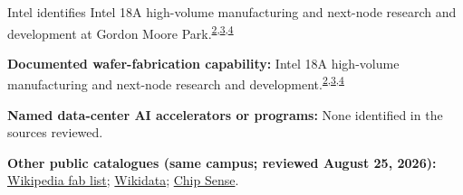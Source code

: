 \begin{minipage}[t][0.90\textheight][t]{\textwidth}
\begin{minipage}[t]{\textwidth}
\begin{minipage}[t]{0.32\textwidth}
\medskip
{\footnotesize Intel identifies Intel 18A high-volume manufacturing and next-node research and development at Gordon Moore Park.\nobreak\textsuperscript{\href{\detokenize{https://www.intc.com/filings-reports/all-sec-filings/content/0000050863-26-000011/intc-20251227.htm}}{\textcolor{accent}{2}},\href{\detokenize{https://www.intc.com/filings-reports/all-sec-filings/content/0000050863-26-000061/proxy2026.htm}}{\textcolor{accent}{3}},\href{\detokenize{https://web.archive.org/web/20260730143304/https://newsroom.intel.com/client-computing/intel-unveils-panther-lake-architecture-first-ai-pc-platform-built-on-18a}}{\textcolor{accent}{4}}}\par}
\medskip
{\footnotesize\textbf{Documented wafer-fabrication capability:} Intel 18A high-volume manufacturing and next-node research and development.\nobreak\textsuperscript{\href{\detokenize{https://www.intc.com/filings-reports/all-sec-filings/content/0000050863-26-000011/intc-20251227.htm}}{\textcolor{accent}{2}},\href{\detokenize{https://www.intc.com/filings-reports/all-sec-filings/content/0000050863-26-000061/proxy2026.htm}}{\textcolor{accent}{3}},\href{\detokenize{https://web.archive.org/web/20260730143304/https://newsroom.intel.com/client-computing/intel-unveils-panther-lake-architecture-first-ai-pc-platform-built-on-18a}}{\textcolor{accent}{4}}}\par}
\end{minipage}
\end{minipage}
\par\vspace{0.65em}
\medskip
{\footnotesize\textbf{Named data-center AI accelerators or programs:} None identified in the sources reviewed.\par}
\smallskip
{\sffamily\scriptsize\color{black!62}\textbf{Other public catalogues (same campus; reviewed August 25, 2026):} \href{\detokenize{https://en.wikipedia.org/w/index.php?title=List_of_semiconductor_fabrication_plants&oldid=1370451124}\#\detokenize{Open_plants}}{Wikipedia fab list}; \href{\detokenize{https://www.wikidata.org/w/index.php?title=Q113380692&oldid=1694236879}}{Wikidata}; \href{\detokenize{https://github.com/aminalav/chip-sense/blob/93d22afe9e1309a7bebd6c7c96541f069f1d67ac/src/data/fab-sites.json}\#\detokenize{L143-L150}}{Chip Sense}.\par}
\medskip

\end{minipage}
